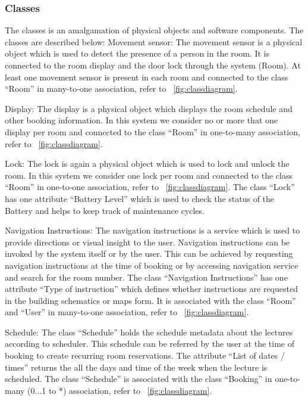 \documentclass[conference,onecolumn]{IEEEtran}
\begin{document}
	\subsubsection*{Classes}
		The classes is an amalgamation of physical objects and software components. The classes are described below:
		Movement sensor: The movement sensor is a physical object which is used to detect the presence of a person in the room. It is connected to the room display and the door lock through the system (Room). At least one movement sensor is present in each room and connected to the class ``Room'' in many-to-one association, refer to \figurename~\ref{fig:classdiagram}.
		
		Display: The display is a physical object which displays the room schedule and other booking information. In this system we consider no or more that one display per room and connected to the class ``Room'' in one-to-many association, refer to \figurename~\ref{fig:classdiagram}.

		Lock: The lock is again a physical object which is used to lock and unlock the room. In this system we consider one lock per room and connected to the class ``Room'' in one-to-one association, refer to \figurename~\ref{fig:classdiagram}. The class ``Lock'' has one attribute ``Battery Level'' which is used to check the status of the Battery and helps to keep track of maintenance cycles.

		Navigation Instructions: The navigation instructions is a service which is used to provide directions or visual insight to the user. Navigation instructions can be invoked by the system itself or by the user. This can be achieved by requesting navigation instructions at the time of booking or by accessing navigation service and search for the room number. The class ``Navigation Instructions'' has one attribute ``Type of instruction'' which defines whether instructions are requested in the building schematics or maps form. It is associated with the class ``Room'' and ``User'' in many-to-one association, refer to \figurename~\ref{fig:classdiagram}.

		Schedule: The class ``Schedule'' holds the schedule metadata about the lectures according to scheduler. This schedule can be referred by the user at the time of booking to create recurring room reservations. The attribute ``List of dates / times'' returns the all the days and time of the week when the lecture is scheduled. The class ``Schedule'' is associated with the class ``Booking'' in one-to-many (0...1 to *) association, refer to \figurename~\ref{fig:classdiagram}.
\end{document}
